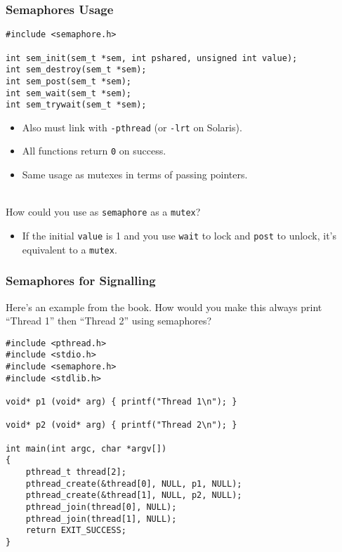 \documentclass[aspectratio=43]{beamer}
\newenvironment{changemargin}[1]{%
  \begin{list}{}{%
    \setlength{\topsep}{0pt}%
    \setlength{\leftmargin}{#1}%
    \setlength{\rightmargin}{1em}
    \setlength{\listparindent}{\parindent}%
    \setlength{\itemindent}{\parindent}%
    \setlength{\parsep}{\parskip}%
  }%
  \item[]}{\end{list}}
\begin{document}
\begin{frame}[fragile]
  \frametitle{Semaphores Usage}
  
  \begin{changemargin}{1cm}
  \begin{lstlisting}
#include <semaphore.h>

int sem_init(sem_t *sem, int pshared, unsigned int value);
int sem_destroy(sem_t *sem);
int sem_post(sem_t *sem);
int sem_wait(sem_t *sem);
int sem_trywait(sem_t *sem);
  \end{lstlisting}

  \begin{itemize}
    \item Also must link with {\tt -pthread} (or {\tt -lrt} on Solaris).
    \item All functions return {\tt 0} on success.
    \item Same usage as mutexes in terms of passing pointers.
  \end{itemize}~\\[1em]
    How could you use as {\tt semaphore} as a {\tt mutex}?
    \begin{itemize}
    \item<2-> If the initial {\tt value} is 1 and you use {\tt wait} to lock
      and {\tt post} to unlock, it's equivalent to a {\tt mutex}.
    \end{itemize}
  \end{changemargin}

\end{frame}

\begin{frame}[fragile]
  \frametitle{Semaphores for Signalling}

  \begin{changemargin}{1cm}
  Here's an example from the book. How would you make this always print
  ``Thread 1'' then ``Thread 2'' using semaphores?

  \begin{lstlisting}
#include <pthread.h>
#include <stdio.h>
#include <semaphore.h>
#include <stdlib.h>

void* p1 (void* arg) { printf("Thread 1\n"); }

void* p2 (void* arg) { printf("Thread 2\n"); }

int main(int argc, char *argv[])
{
    pthread_t thread[2];
    pthread_create(&thread[0], NULL, p1, NULL);
    pthread_create(&thread[1], NULL, p2, NULL);
    pthread_join(thread[0], NULL);
    pthread_join(thread[1], NULL);
    return EXIT_SUCCESS;
}
  \end{lstlisting}
\end{changemargin}
\end{frame}
\end{document}
